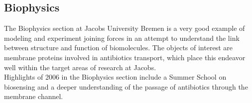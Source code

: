 \newpage {}
\subsection{Biophysics}

The Biophysics section at Jacobs University Bremen is a very good example of modeling and experiment joining forces in an attempt to understand the link between structure and function of biomolecules. The objects of interest are membrane proteins involved in antibiotics transport, which place this endeavor well within the target areas of research at Jacobs.\\

Highlights of 2006 in the Biophysics section include a Summer School on biosensing and a deeper understanding of the passage of antibiotics through the membrane channel.\\

